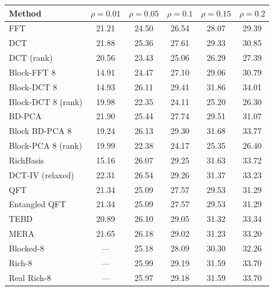 %
\begin{tabular}{lccccc}
\toprule
Method & $\rho=0.01$ & $\rho=0.05$ & $\rho=0.1$ & $\rho=0.15$ & $\rho=0.2$ \\
\midrule
FFT & 21.21 & 24.50 & 26.54 & 28.07 & 29.39 \\
DCT & 21.88 & 25.36 & 27.61 & 29.33 & 30.85 \\
DCT (rank) & 20.56 & 23.43 & 25.06 & 26.29 & 27.39 \\
Block-FFT 8 & 14.91 & 24.47 & 27.10 & 29.06 & 30.79 \\
Block-DCT 8 & 14.93 & 26.11 & 29.41 & 31.86 & 34.01 \\
Block-DCT 8 (rank) & 19.98 & 22.35 & 24.11 & 25.20 & 26.30 \\
\midrule
BD-PCA & 21.90 & 25.44 & 27.74 & 29.51 & 31.07 \\
Block BD-PCA 8 & 19.24 & 26.13 & 29.30 & 31.68 & 33.77 \\
Block-PCA 8 (rank) & 19.99 & 22.38 & 24.17 & 25.35 & 26.40 \\
\midrule
RichBasis & 15.16 & 26.07 & 29.25 & 31.63 & 33.72 \\
DCT-IV (relaxed) & 22.31 & 26.54 & 29.26 & 31.37 & 33.23 \\
QFT & 21.34 & 25.09 & 27.57 & 29.53 & 31.29 \\
Entangled QFT & 21.34 & 25.09 & 27.57 & 29.53 & 31.29 \\
TEBD & 20.89 & 26.10 & 29.05 & 31.32 & 33.34 \\
MERA & 21.65 & 26.18 & 29.02 & 31.23 & 33.20 \\
\midrule
Blocked-8 & — & 25.18 & 28.09 & 30.30 & 32.26 \\
Rich-8 & — & 25.99 & 29.19 & 31.59 & 33.70 \\
Real Rich-8 & — & 25.97 & 29.18 & 31.59 & 33.70 \\
\bottomrule
\end{tabular}
